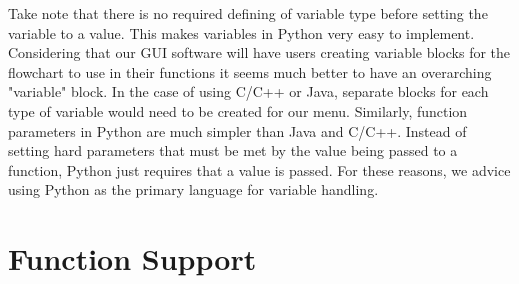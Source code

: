 \documentclass[journal,10pt,onecolumn,compsoc]{IEEEtran} \usepackage[margin=1.0in]{geometry} \usepackage{pdfpages} \usepackage{graphicx}
\begin{document}
\noindent Take note that there is no required defining of variable type before setting the variable to a value. \cite{Pythonvar} 
This makes variables in Python very easy to implement.
Considering that our GUI software will have users creating variable blocks for the flowchart to use in their functions it seems much better to have an overarching "variable" block. 
In the case of using C/C++ or Java, separate blocks for each type of variable would need to be created for our menu.
Similarly, function parameters in Python are much simpler than Java and C/C++.
Instead of setting hard parameters that must be met by the value being passed to a function, Python just requires that a value is passed. \cite{Pythonfunction} 
For these reasons, we advice using Python as the primary language for variable handling.
\newpage

\section{Function Support}
\end{document}
